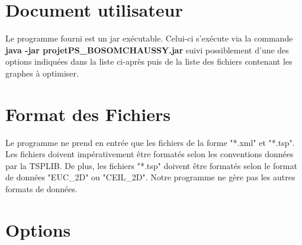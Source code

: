 \documentclass{article}
\begin{document}



\section{Document utilisateur}

Le programme fourni est un jar exécutable. Celui-ci s'exécute via la commande \textbf{java -jar projetPS\_BOSOMCHAUSSY.jar} suivi possiblement d'une des options indiquées dans la liste ci-après puis de la liste des fichiers contenant les graphes à optimiser.

\section{Format des Fichiers}

Le programme ne prend en entrée que les fichiers de la forme "*.xml" et "*.tsp". Les fichiers doivent impérativement être formatés selon les conventions données par la TSPLIB.
De plus, les fichiers "*.tsp" doivent être formatés selon le format de données "EUC\_2D" ou "CEIL\_2D". Notre programme ne gère pas les autres formats de données.

\section{Options}
\end{document}
